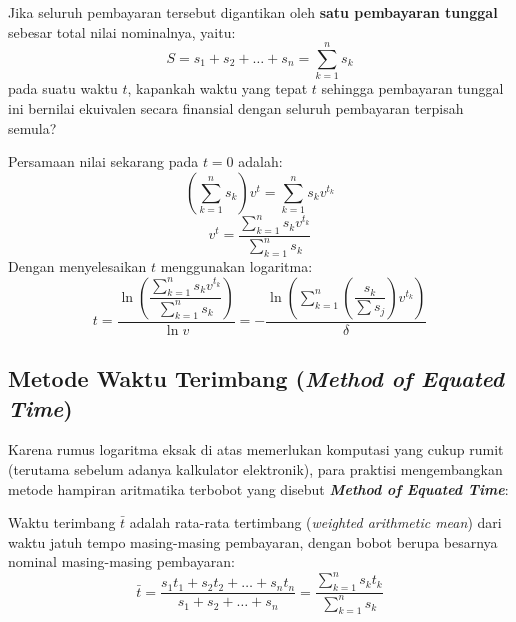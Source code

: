 \documentclass[11pt,a4paper]{article}
\begin{document}
Jika seluruh pembayaran tersebut digantikan oleh \textbf{satu pembayaran tunggal} sebesar total nilai nominalnya, yaitu:
\begin{equation*}
    S = s_1 + s_2 + \dots + s_n = \sum_{k=1}^n s_k
\end{equation*}
pada suatu waktu $t$, kapankah waktu yang tepat $t$ sehingga pembayaran tunggal ini bernilai ekuivalen secara finansial dengan seluruh pembayaran terpisah semula?

\begin{definitionbox}
Persamaan nilai sekarang pada $t = 0$ adalah:
\begin{equation}
    \left( \sum_{k=1}^n s_k \right) v^t = \sum_{k=1}^n s_k v^{t_k}
\end{equation}
\begin{equation}
    v^t = \frac{\sum_{k=1}^n s_k v^{t_k}}{\sum_{k=1}^n s_k}
\end{equation}
Dengan menyelesaikan $t$ menggunakan logaritma:
\begin{equation}
    t = \frac{\ln\left( \dfrac{\sum_{k=1}^n s_k v^{t_k}}{\sum_{k=1}^n s_k} \right)}{\ln v} = -\frac{\ln\left( \sum_{k=1}^n \left(\dfrac{s_k}{\sum s_j}\right) v^{t_k} \right)}{\delta}
\end{equation}
\end{definitionbox}

\subsection{Metode Waktu Terimbang (\textit{Method of Equated Time})}
Karena rumus logaritma eksak di atas memerlukan komputasi yang cukup rumit (terutama sebelum adanya kalkulator elektronik), para praktisi mengembangkan metode hampiran aritmatika terbobot yang disebut \textbf{\textit{Method of Equated Time}}:

\begin{definitionbox}
Waktu terimbang $\bar{t}$ adalah rata-rata tertimbang (\textit{weighted arithmetic mean}) dari waktu jatuh tempo masing-masing pembayaran, dengan bobot berupa besarnya nominal masing-masing pembayaran:
\begin{equation}
    \bar{t} = \frac{s_1 t_1 + s_2 t_2 + \dots + s_n t_n}{s_1 + s_2 + \dots + s_n} = \frac{\sum_{k=1}^n s_k t_k}{\sum_{k=1}^n s_k}
\end{equation}
\end{definitionbox}
\end{document}

